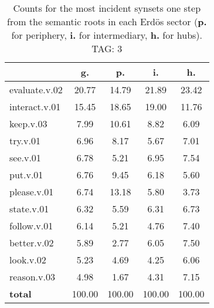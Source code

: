 \begin{table}[h!]
\begin{center}
\begin{tabular}{| l | c | c | c | c |}\hline
 & g. & p. & i. & h. \\\hline
evaluate.v.02 & 20.77  & 14.79  & 21.89  & 23.42 \\\hline
interact.v.01 & 15.45  & 18.65  & 19.00  & 11.76 \\\hline
keep.v.03 & 7.99  & 10.61  & 8.82  & 6.09 \\\hline
try.v.01 & 6.96  & 8.17  & 5.67  & 7.01 \\\hline
see.v.01 & 6.78  & 5.21  & 6.95  & 7.54 \\\hline
put.v.01 & 6.76  & 9.45  & 6.18  & 5.60 \\\hline
please.v.01 & 6.74  & 13.18  & 5.80  & 3.73 \\\hline
state.v.01 & 6.32  & 5.59  & 6.31  & 6.73 \\\hline
follow.v.01 & 6.14  & 5.21  & 4.76  & 7.40 \\\hline
better.v.02 & 5.89  & 2.77  & 6.05  & 7.50 \\\hline
look.v.02 & 5.23  & 4.69  & 4.25  & 6.06 \\\hline
reason.v.03 & 4.98  & 1.67  & 4.31  & 7.15 \\\hline
{{\bf total}} & 100.00  & 100.00  & 100.00  & 100.00 \\\hline
\end{tabular}
\caption{Counts for the most incident synsets one step from the semantic roots in each Erd\"os sector ({\bf p.} for periphery, {\bf i.} for intermediary, {\bf h.} for hubs). TAG: 3}
\end{center}
\end{table}